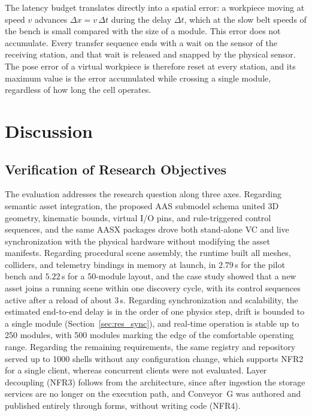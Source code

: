 \documentclass{ieeeojies}
\begin{document}
The latency budget translates directly into a spatial error: a workpiece moving at speed $v$ advances $\Delta x = v\,\Delta t$ during the delay $\Delta t$, which at the slow belt speeds of the bench is small compared with the size of a module. This error does not accumulate. Every transfer sequence ends with a wait on the sensor of the receiving station, and that wait is released and snapped by the physical sensor. The pose error of a virtual workpiece is therefore reset at every station, and its maximum value is the error accumulated while crossing a single module, regardless of how long the cell operates. 
\section{Discussion}
\label{sec:discussion}

\subsection{Verification of Research Objectives}
\label{sec:disc_verification}

The evaluation addresses the research question along three axes. Regarding semantic asset integration, the proposed AAS submodel schema united 3D geometry, kinematic bounds, virtual I/O pins, and rule-triggered control sequences, and the same AASX packages drove both stand-alone VC and live synchronization with the physical hardware without modifying the asset manifests. Regarding procedural scene assembly, the runtime built all meshes, colliders, and telemetry bindings in memory at launch, in $2.79$\,s for the pilot bench and $5.22$\,s for a 50-module layout, and the case study showed that a new asset joins a running scene within one discovery cycle, with its control sequences active after a reload of about 3\,s. Regarding synchronization and scalability, the estimated end-to-end delay is in the order of one physics step, drift is bounded to a single module (Section~\ref{sec:res_sync}), and real-time operation is stable up to 250 modules, with 500 modules marking the edge of the comfortable operating range. Regarding the remaining requirements, the same registry and repository served up to 1000 shells without any configuration change, which supports NFR2 for a single client, whereas concurrent clients were not evaluated. Layer decoupling (NFR3) follows from the architecture, since after ingestion the storage services are no longer on the execution path, and Conveyor~G was authored and published entirely through forms, without writing code (NFR4).
\end{document}
